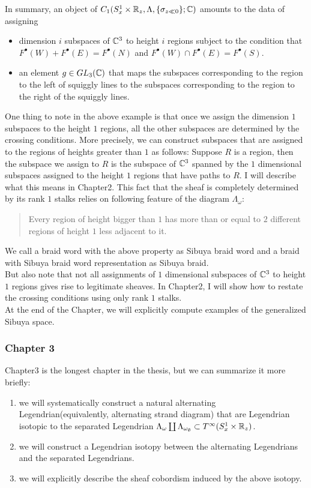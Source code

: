 In summary, an object of $C_1(S^1_x\times \mathbb{R}_z,\Lambda,\{\sigma_{z\ll 0}\};\mathbb{C})$ amounts to the data of assigning 
\begin{itemize}
\item  dimension $i$ subspaces of $\mathbb{C}^3$ to height $i$ regions subject to the condition that $F^\bullet(W)+F^\bullet(E) = F^\bullet(N)$ and $F^\bullet(W)\cap F^\bullet(E) = F^\bullet(S)$.

\item an element $g \in GL_3(\mathbb{C})$ that maps the subspaces corresponding to the region to the left of squiggly lines to the subspaces corresponding to the region to the right of the squiggly lines.
\end{itemize}
One thing to note in the above example is that once we assign the dimension $1$ subspaces to the height $1$ regions, all the other subspaces are determined by the crossing conditions. More precisely, we can construct subspaces that are assigned to the regions of heights greater than $1$ as follows: Suppose $R$ is a region, then the subspace we assign to $R$ is the subspace of $\mathbb{C}^3$ spanned by the $1$ dimensional subspaces assigned to the height $1$ regions that have paths to $R$. I will describe what this means in Chapter2. This fact that the sheaf is completely determined by its rank $1$ stalks relies on following feature of the diagram $\Lambda_\omega$:
\begin{quote}
Every region of height bigger than $1$ has more than or equal to $2$ different regions of height $1$ less adjacent to it.
\end{quote}
We call a braid word with the above property as Sibuya braid word and a braid with Sibuya braid word representation as Sibuya braid.\\
But also note that not all assignments of $1$ dimensional subspaces of $\mathbb{C}^3$ to height $1$ regions gives rise to legitimate sheaves. In Chapter2, I will show how to restate the crossing conditions using only rank $1$ stalks.\\
At the end of the Chapter, we will explicitly compute examples of the generalized Sibuya space.
\subsubsection*{Chapter 3}
Chapter3 is the longest chapter in the thesis, but we can summarize it more briefly:
\begin{enumerate}[label = (\roman*)]
\item we will systematically construct a natural alternating Legendrian(equivalently, alternating strand diagram) that are Legendrian isotopic to the separated Legendrian $\Lambda_\omega \coprod \Lambda_{\omega_\emptyset} \subset T^\infty(S^1_x \times \mathbb{R}_z)$.

\item we will construct a Legendrian isotopy between the alternating Legendrians and the separated Legendrians.

\item we will explicitly describe the sheaf cobordism induced by the above isotopy.
\end{enumerate}


